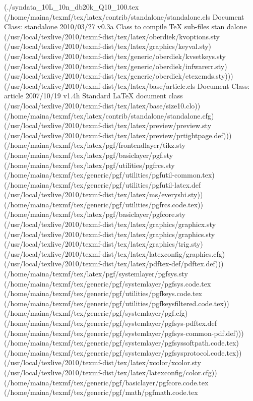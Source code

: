 \begin{center}
\begin{center}
(./syndata_10L_10n_db20k_Q10_100.tex
(/home/maina/texmf/tex/latex/contrib/standalone/standalone.cls
Document Class: standalone 2010/03/27 v0.3a Class to compile TeX sub-files stan
dalone
(/usr/local/texlive/2010/texmf-dist/tex/latex/oberdiek/kvoptions.sty
(/usr/local/texlive/2010/texmf-dist/tex/latex/graphics/keyval.sty)
(/usr/local/texlive/2010/texmf-dist/tex/generic/oberdiek/kvsetkeys.sty
(/usr/local/texlive/2010/texmf-dist/tex/generic/oberdiek/infwarerr.sty)
(/usr/local/texlive/2010/texmf-dist/tex/generic/oberdiek/etexcmds.sty)))
(/usr/local/texlive/2010/texmf-dist/tex/latex/base/article.cls
Document Class: article 2007/10/19 v1.4h Standard LaTeX document class
(/usr/local/texlive/2010/texmf-dist/tex/latex/base/size10.clo))
(/home/maina/texmf/tex/latex/contrib/standalone/standalone.cfg)
(/usr/local/texlive/2010/texmf-dist/tex/latex/preview/preview.sty
(/usr/local/texlive/2010/texmf-dist/tex/latex/preview/prtightpage.def)))
(/home/maina/texmf/tex/latex/pgf/frontendlayer/tikz.sty
(/home/maina/texmf/tex/latex/pgf/basiclayer/pgf.sty
(/home/maina/texmf/tex/latex/pgf/utilities/pgfrcs.sty
(/home/maina/texmf/tex/generic/pgf/utilities/pgfutil-common.tex)
(/home/maina/texmf/tex/generic/pgf/utilities/pgfutil-latex.def
(/usr/local/texlive/2010/texmf-dist/tex/latex/ms/everyshi.sty))
(/home/maina/texmf/tex/generic/pgf/utilities/pgfrcs.code.tex))
(/home/maina/texmf/tex/latex/pgf/basiclayer/pgfcore.sty
(/usr/local/texlive/2010/texmf-dist/tex/latex/graphics/graphicx.sty
(/usr/local/texlive/2010/texmf-dist/tex/latex/graphics/graphics.sty
(/usr/local/texlive/2010/texmf-dist/tex/latex/graphics/trig.sty)
(/usr/local/texlive/2010/texmf-dist/tex/latex/latexconfig/graphics.cfg)
(/usr/local/texlive/2010/texmf-dist/tex/latex/pdftex-def/pdftex.def)))
(/home/maina/texmf/tex/latex/pgf/systemlayer/pgfsys.sty
(/home/maina/texmf/tex/generic/pgf/systemlayer/pgfsys.code.tex
(/home/maina/texmf/tex/generic/pgf/utilities/pgfkeys.code.tex
(/home/maina/texmf/tex/generic/pgf/utilities/pgfkeysfiltered.code.tex))
(/home/maina/texmf/tex/generic/pgf/systemlayer/pgf.cfg)
(/home/maina/texmf/tex/generic/pgf/systemlayer/pgfsys-pdftex.def
(/home/maina/texmf/tex/generic/pgf/systemlayer/pgfsys-common-pdf.def)))
(/home/maina/texmf/tex/generic/pgf/systemlayer/pgfsyssoftpath.code.tex)
(/home/maina/texmf/tex/generic/pgf/systemlayer/pgfsysprotocol.code.tex))
(/usr/local/texlive/2010/texmf-dist/tex/latex/xcolor/xcolor.sty
(/usr/local/texlive/2010/texmf-dist/tex/latex/latexconfig/color.cfg))
(/home/maina/texmf/tex/generic/pgf/basiclayer/pgfcore.code.tex
(/home/maina/texmf/tex/generic/pgf/math/pgfmath.code.tex

\end{center}
\end{center}
